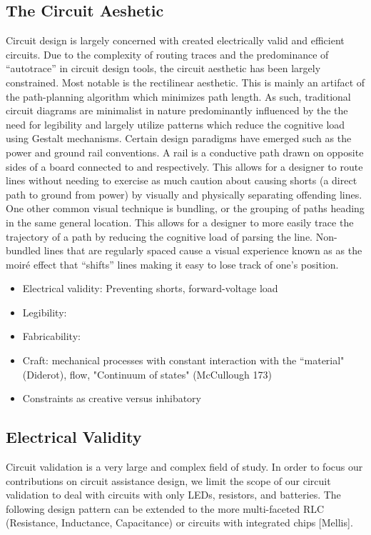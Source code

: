\documentclass{sigchi}
\begin{document}
    \subsection{The Circuit Aeshetic} Circuit design is largely concerned with created electrically valid and efficient circuits.  Due to the complexity of routing traces and the predominance of ``autotrace'' in circuit design tools, the circuit aesthetic has been largely constrained. Most notable is the rectilinear aesthetic. This is mainly an artifact of the path-planning algorithm which minimizes path length. As such, traditional circuit diagrams are minimalist in nature predominantly influenced by the the need for legibility and largely utilize patterns which reduce the cognitive load using Gestalt mechanisms. Certain design paradigms have emerged such as the power and ground rail conventions. A rail is a conductive path drawn on opposite sides of a board connected to  and  respectively. This allows for a designer to route lines without needing to exercise as much caution about causing shorts (a direct path to ground from power) by visually and physically separating offending lines. One other common visual technique is bundling, or the grouping of paths heading in the same general location. This allows for a designer to more easily trace the trajectory of a path by reducing the cognitive load of parsing the line. Non-bundled lines that are regularly spaced cause a visual experience known as as the moir\'e effect that ``shifts'' lines making it easy to lose track of one's position.
    
    
            
    \begin{itemize}
        \item Electrical validity: Preventing shorts, forward-voltage load
        \item Legibility: 
        \item Fabricability:
    \end{itemize}
    
    \begin{itemize}
        \item Craft: mechanical processes with constant interaction with the ``material" (Diderot), flow, "Continuum of states" (McCullough 173)
        \item Constraints as creative versus inhibatory
    \end{itemize}
    \subsection{Electrical Validity}
     Circuit validation is a very large and complex field of study. In order to focus our contributions on circuit assistance design, we limit the scope of our circuit validation to deal with circuits with only LEDs, resistors, and batteries. The following design pattern can be extended to the more multi-faceted RLC (Resistance, Inductance, Capacitance) or circuits with integrated chips [Mellis]. 
     
\end{document}
